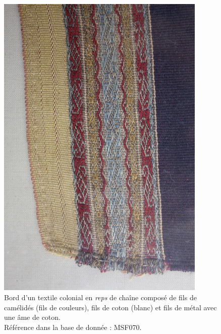 \begin{figure}[!ht]
       \begin{center}
        		\includegraphics[width=10cm]{../images/MSF070_IMG_6250.jpg}
	\end{center}
    \caption{Bord d'un textile colonial en \textit{reps} de chaîne composé de fils de camélidés (fils de couleurs), fils de coton (blanc) et fils de métal avec une âme de coton. \\ Référence dans la base de donnée : MSF070.}
    \label{fig:MSF070}
\end{figure}

